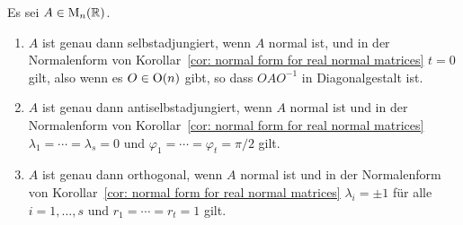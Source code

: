 \begin{corollary}
  Es sei $A \in \mathrm{M}_n(\mathbb{R})$.
  \begin{enumerate}[leftmargin=*, label=\roman*)]
    \item
      $A$ ist genau dann selbstadjungiert, wenn $A$ normal ist, und in der Normalenform von Korollar~\ref{cor: normal form for real normal matrices} $t = 0$ gilt, also wenn es $O \in \mathrm{O}(n)$ gibt, so dass $O A O^{-1}$ in Diagonalgestalt ist.
    \item
      $A$ ist genau dann antiselbstadjungiert, wenn $A$ normal ist und in der Normalenform von Korollar~\ref{cor: normal form for real normal matrices} $\lambda_1 = \dotsb = \lambda_s = 0$ und $\varphi_1 = \dotsb = \varphi_t = \pi/2$ gilt.
    \item
      $A$ ist genau dann orthogonal, wenn $A$ normal ist und in der Normalenform von Korollar~\ref{cor: normal form for real normal matrices} $\lambda_i = \pm 1$ für alle $i = 1, \dotsc, s$ und $r_1 = \dotsb = r_t = 1$ gilt.
  \end{enumerate}
\end{corollary}
























